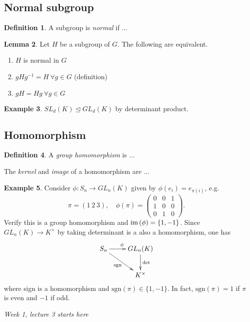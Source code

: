 \documentclass{article}
\newcommand{\sgn}{\text{sgn}}
\newcommand{\im}{\text{im\,}}
\theoremstyle{definition}
\newtheorem{defn}{Definition}[subsection]
\newtheorem{lemma}[defn]{Lemma}
\newtheorem{example}[defn]{Example}
\begin{document}
\subsection{Normal subgroup}

\begin{defn}
A subgroup is \textit{normal} if ...
\end{defn}
\begin{lemma}
Let $H$ be a subgroup of $G$. The following are equivalent.
\begin{enumerate}
\item $H$ is normal in $G$
\item $gHg^{-1}=H \ \forall g\in G$ \qquad (definition)
\item $gH=Hg \ \forall g\in G$
\end{enumerate}
\end{lemma}
\begin{example}
$SL_d(K)\unlhd GL_d(K)$ by determinant product.
\end{example}

\subsection{Homomorphism}

\begin{defn}
A \textit{group homomorphism} is ...

The \textit{kernel} and \textit{image} of a homomorphism are ...
\end{defn}

\begin{example}
\label{example:1stexofrep}
Consider $\phi:S_n\rightarrow GL_n(K)$ given by $\phi(e_i)=e_{\pi(i)}$, e.g.
\[
\pi=(1\ 2\ 3),\quad \phi(\pi)=\begin{pmatrix}
  0 & 0 & 1 \\ 1 & 0 & 0 \\ 0 & 1 & 0
\end{pmatrix}.
\]
Verify this is a group homomorphism and $\im(\phi)=\{1,-1\}$. Since $GL_n(K)\rightarrow K^\times$ by taking determinant is a also a homomorphism, one has
\[
\xymatrix{
    S_n\ar[r]^\phi \ar[dr]_{\sgn} & GL_n(K)\ar[d]^\det  \\ & K^\times
}
\]
where sign is a homomorphism and $\sgn(\pi)\in\{1,-1\}$. In fact, $\sgn(\pi)=1$ if $\pi$ is even and $-1$ if odd.
\end{example}

\begin{flushright}
\textit{Week 1, lecture 3 starts here}
\end{flushright}
\end{document}
